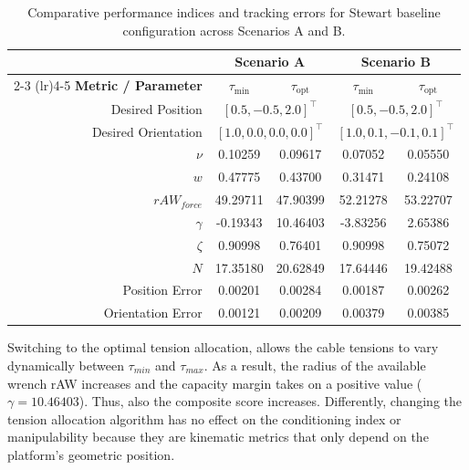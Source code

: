 \begin{table}[htbp]
\centering
\small
\begin{threeparttable}
\begin{tabular}{rcccc}
\toprule
 & \multicolumn{2}{c}{\textbf{Scenario A}} & \multicolumn{2}{c}{\textbf{Scenario B}} \\
\cmidrule(lr){2-3} \cmidrule(lr){4-5}
\textbf{Metric / Parameter} & $\tau_{\text{min}}$ & $\tau_{\text{opt}}$ & $\tau_{\text{min}}$ & $\tau_{\text{opt}}$ \\ 
\midrule
Desired Position & \multicolumn{2}{c}{$[0.5, -0.5, 2.0]^\top$} & \multicolumn{2}{c}{$[0.5, -0.5, 2.0]^\top$} \\
Desired Orientation & \multicolumn{2}{c}{$[1.0, 0.0, 0.0, 0.0]^\top$} & \multicolumn{2}{c}{$[1.0, 0.1, -0.1, 0.1]^\top$} \\
\midrule
$\nu$  & 0.10259 & 0.09617 & 0.07052 & 0.05550 \\
$w$ & 0.47775 & 0.43700 & 0.31471 & 0.24108 \\
$rAW_{force}$  & 49.29711 & 47.90399 & 52.21278 & 53.22707 \\
$\gamma$ & -0.19343 & 10.46403 & -3.83256 & 2.65386 \\
$\zeta$  &  0.90998 & 0.76401 & 0.90998 & 0.75072 \\
$N$ & 17.35180 & 20.62849 & 17.64446 & 19.42488 \\
\midrule
Position Error & 0.00201 & 0.00284 & 0.00187 & 0.00262 \\
Orientation Error & 0.00121 & 0.00209 & 0.00379 & 0.00385 \\
\bottomrule
\end{tabular}
\caption{Comparative performance indices and tracking errors for Stewart baseline configuration across Scenarios A and B.}
\label{tab:stewart_comparative}

\end{threeparttable}
\end{table}


Switching to the optimal tension allocation, allows the cable tensions to vary dynamically between $\tau_{min}$ and $\tau_{max}$. As a result, the radius of the available wrench rAW increases and the capacity margin takes on a positive value ($\gamma = 10.46403$). Thus, also the composite score increases. Differently, changing the tension allocation algorithm has no effect on the conditioning index or manipulability because they are kinematic metrics that only depend on the platform's geometric position.

